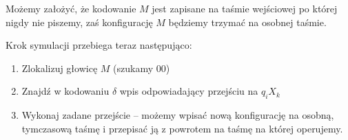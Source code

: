 Możemy założyć, że kodowanie \( M \) jest zapisane na taśmie wejściowej po której nigdy nie piszemy, zaś konfigurację \( M \) będziemy trzymać na osobnej taśmie.

Krok symulacji przebiega teraz następująco:
\begin{enumerate}
    \item Zlokalizuj głowicę \( M \) (szukamy \( 00 \))
    \item Znajdź w kodowaniu \( \delta \) wpis odpowiadający przejściu na \( q_i X_k \)
    \item Wykonaj zadane przejście -- możemy wpisać nową konfigurację na osobną, tymczasową taśmę i przepisać ją z powrotem na taśmę na której operujemy.
    
\end{enumerate}


